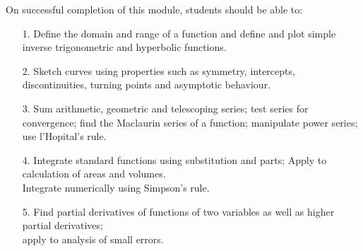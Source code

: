 
On successful completion of this module, students should be able to:
\begin{itemize}
\item[1.] Define the domain and range of a function and define and plot simple inverse trigonometric and hyperbolic  functions. 

\item[2.] Sketch curves using properties such as symmetry, intercepts, discontinuities, turning points and asymptotic behaviour. 

\item[3.] Sum arithmetic, geometric and telescoping series; test series for convergence; find the Maclaurin series of a function; manipulate power series; use l'Hopital's rule. 
\end{itemize}

	
\begin{itemize}
	\item[4.] Integrate standard functions using substitution and parts; Apply to calculation of areas and volumes. \\ Integrate numerically using Simpson's rule. 

\item[5.] Find partial derivatives of functions of two variables as well as higher partial derivatives;\\ apply to analysis of small errors.
\end{itemize}


